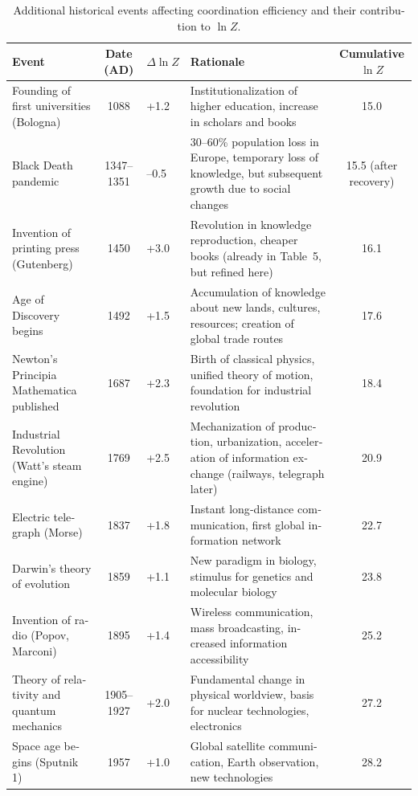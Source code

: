 \documentclass[11pt,a4paper]{article}
\begin{document}
	\begin{table}[htbp]
		\begin{otherlanguage}{english}
			\centering
			\caption{Additional historical events affecting coordination efficiency and their contribution to \(\ln Z\).}
			\label{tab:expanded-events}
			\scriptsize  
			\begin{tabular}{p{3.2cm} c p{2.5cm} p{4.5cm} c}
				\toprule
				\textbf{Event} & \textbf{Date (AD)} & \textbf{\(\Delta \ln Z\)} & \textbf{Rationale} & \textbf{Cumulative \(\ln Z\)} \\
				\midrule
				Founding of first universities (Bologna) & 1088 & +1.2 & Institutionalization of higher education, increase in scholars and books & 15.0 \\
				Black Death pandemic & 1347–1351 & –0.5 & 30–60\% population loss in Europe, temporary loss of knowledge, but subsequent growth due to social changes & 15.5 (after recovery) \\
				Invention of printing press (Gutenberg) & 1450 & +3.0 & Revolution in knowledge reproduction, cheaper books (already in Table~5, but refined here) & 16.1 \\
				Age of Discovery begins & 1492 & +1.5 & Accumulation of knowledge about new lands, cultures, resources; creation of global trade routes & 17.6 \\
				Newton's Principia Mathematica published & 1687 & +2.3 & Birth of classical physics, unified theory of motion, foundation for industrial revolution & 18.4 \\
				Industrial Revolution (Watt's steam engine) & 1769 & +2.5 & Mechanization of production, urbanization, acceleration of information exchange (railways, telegraph later) & 20.9 \\
				Electric telegraph (Morse) & 1837 & +1.8 & Instant long‑distance communication, first global information network & 22.7 \\
				Darwin's theory of evolution & 1859 & +1.1 & New paradigm in biology, stimulus for genetics and molecular biology & 23.8 \\
				Invention of radio (Popov, Marconi) & 1895 & +1.4 & Wireless communication, mass broadcasting, increased information accessibility & 25.2 \\
				Theory of relativity and quantum mechanics & 1905–1927 & +2.0 & Fundamental change in physical worldview, basis for nuclear technologies, electronics & 27.2 \\
				Space age begins (Sputnik 1) & 1957 & +1.0 & Global satellite communication, Earth observation, new technologies & 28.2 \\

\end{tabular}
\end{otherlanguage}
\end{table}
\end{document}
